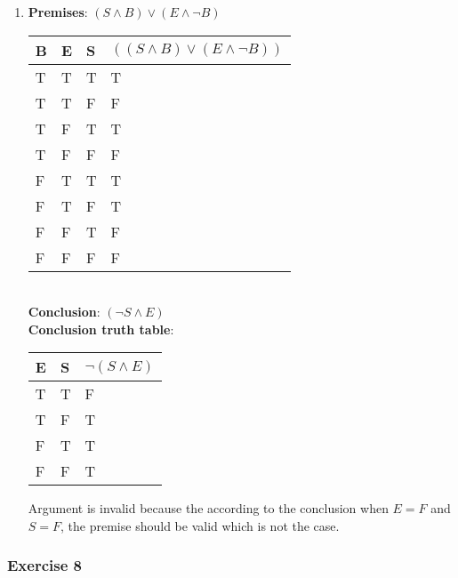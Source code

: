 \begin{solution}
\begin{enumerate}[label=(\alph*)]
{            Whenever the conclusion truth table is $T$, for those parameters of $J$ and $S$, the premises truth table is also true which implies that the conclusion is valid.
        }
        \item {
            \textbf{Premises}: $(S \wedge B) \vee (E \wedge \neg B)$
            \begin{tabular}[c]{l l l | l }
                B & E & S & $((S \wedge B) \vee (E \wedge \neg B))$ \\ \hline
                T & T & T & T \\
                T & T & F & F \\
                T & F & T & T \\
                T & F & F & F \\
                F & T & T & T \\
                F & T & F & T \\
                F & F & T & F \\
                F & F & F & F
            \end{tabular}
            \\
            \textbf{Conclusion}: $(\neg S \wedge E)$ \\
            \textbf{Conclusion truth table}:
            \begin{tabular}[c]{l l | l}
                E & S & $\neg (S \wedge E)$ \\ \hline
                T & T & F \\
                T & F & T \\
                F & T & T \\
                F & F & T
            \end{tabular}
            Argument is invalid because the according to the conclusion when $E = F$ and $S = F$, the premise should be valid which is not the case.
        }
    \end{enumerate}
\end{solution}

\subsubsection{Exercise 8}


